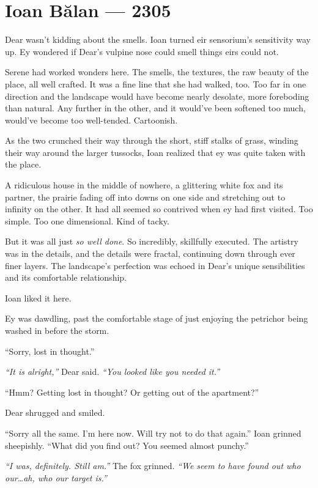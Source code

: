 \hypertarget{ioan-bux103lan-2305}{%
\chapter*{Ioan Bălan — 2305}\label{ioan-bux103lan-2305}}
\vspace{2ex}

Dear wasn't kidding about the smells. Ioan turned eir sensorium's sensitivity way up. Ey wondered if Dear's vulpine nose could smell things eirs could not.

Serene had worked wonders here. The smells, the textures, the raw beauty of the place, all well crafted. It was a fine line that she had walked, too. Too far in one direction and the landscape would have become nearly desolate, more foreboding than natural. Any further in the other, and it would've been softened too much, would've become too well-tended. Cartoonish.

As the two crunched their way through the short, stiff stalks of grass, winding their way around the larger tussocks, Ioan realized that ey was quite taken with the place.

A ridiculous house in the middle of nowhere, a glittering white fox and its partner, the prairie fading off into downs on one side and stretching out to infinity on the other. It had all seemed so contrived when ey had first visited. Too simple. Too one dimensional. Kind of tacky.

But it was all just \emph{so well done}. So incredibly, skillfully executed. The artistry was in the details, and the details were fractal, continuing down through ever finer layers. The landscape's perfection was echoed in Dear's unique sensibilities and its comfortable \mbox{relationship.}

Ioan liked it here.

Ey was dawdling, past the comfortable stage of just enjoying the petrichor being washed in before the storm.

``Sorry, lost in thought.''

\emph{``It is alright,''} Dear said. \emph{``You looked like you needed it.''}

``Hmm? Getting lost in thought? Or getting out of the apartment?''

Dear shrugged and smiled.

``Sorry all the same. I'm here now. Will try not to do that again.'' Ioan grinned sheepishly. ``What did you find out? You seemed almost punchy.''

\emph{``I was, definitely. Still am.''} The fox grinned. \emph{``We seem to have found out who our\ldots{}ah, who our target is.''}

